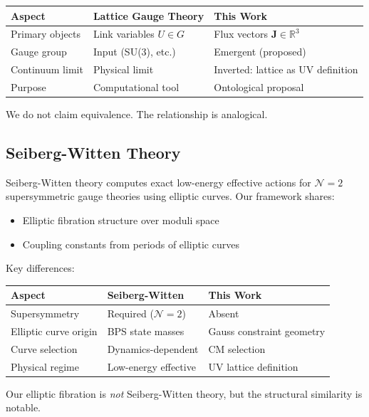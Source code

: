 \documentclass[11pt,a4paper]{article}
\theoremstyle{definition}
\theoremstyle{remark}
\newcommand{\Rthree}{\mathbb{R}^3}
\begin{document}
\begin{center}
\begin{tabular}{lll}
\toprule
Aspect & Lattice Gauge Theory & This Work \\
\midrule
Primary objects & Link variables $U \in G$ & Flux vectors $\mathbf{J} \in \Rthree$ \\
Gauge group & Input (SU(3), etc.) & Emergent (proposed) \\
Continuum limit & Physical limit & Inverted: lattice as UV definition \\
Purpose & Computational tool & Ontological proposal \\
\bottomrule
\end{tabular}
\end{center}

We do not claim equivalence. The relationship is analogical.

\subsection{Seiberg-Witten Theory}

Seiberg-Witten theory computes exact low-energy effective actions for $\mathcal{N}=2$ supersymmetric gauge theories using elliptic curves. Our framework shares:
\begin{itemize}
    \item Elliptic fibration structure over moduli space
    \item Coupling constants from periods of elliptic curves
\end{itemize}

Key differences:
\begin{center}
\begin{tabular}{lll}
\toprule
Aspect & Seiberg-Witten & This Work \\
\midrule
Supersymmetry & Required ($\mathcal{N}=2$) & Absent \\
Elliptic curve origin & BPS state masses & Gauss constraint geometry \\
Curve selection & Dynamics-dependent & CM selection \\
Physical regime & Low-energy effective & UV lattice definition \\
\bottomrule
\end{tabular}
\end{center}

Our elliptic fibration is \emph{not} Seiberg-Witten theory, but the structural similarity is notable.
\end{document}
